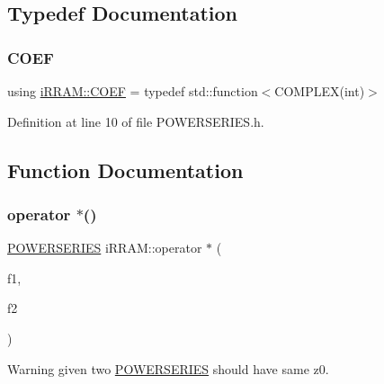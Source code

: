 \subsection{Typedef Documentation}
\mbox{\label{namespacei_r_r_a_m_a7fb438d61c85aface41ae108812df36f}} 
\subsubsection{\texorpdfstring{COEF}{COEF}}
{\footnotesize\ttfamily using \mbox{\hyperlink{namespacei_r_r_a_m_a7fb438d61c85aface41ae108812df36f}{i\+R\+R\+A\+M\+::\+C\+O\+EF}} = typedef std\+::function$<$C\+O\+M\+P\+L\+EX(int)$>$}



Definition at line 10 of file P\+O\+W\+E\+R\+S\+E\+R\+I\+E\+S.\+h.



\subsection{Function Documentation}
\mbox{\label{namespacei_r_r_a_m_a26a16dd1e1f58b33a07c80c72fb3664a}} 
\subsubsection{\texorpdfstring{operator $\ast$()}{operator *()}}
{\footnotesize\ttfamily \mbox{\hyperlink{classi_r_r_a_m_1_1_p_o_w_e_r_s_e_r_i_e_s}{P\+O\+W\+E\+R\+S\+E\+R\+I\+ES}} i\+R\+R\+A\+M\+::operator $\ast$ (\begin{DoxyParamCaption}\item[{const \mbox{\hyperlink{classi_r_r_a_m_1_1_p_o_w_e_r_s_e_r_i_e_s}{P\+O\+W\+E\+R\+S\+E\+R\+I\+ES}} \&}]{f1,  }\item[{const \mbox{\hyperlink{classi_r_r_a_m_1_1_p_o_w_e_r_s_e_r_i_e_s}{P\+O\+W\+E\+R\+S\+E\+R\+I\+ES}} \&}]{f2 }\end{DoxyParamCaption})}

\begin{DoxyWarning}{Warning}
given two \mbox{\hyperlink{classi_r_r_a_m_1_1_p_o_w_e_r_s_e_r_i_e_s}{P\+O\+W\+E\+R\+S\+E\+R\+I\+ES}} should have same z0. 
\end{DoxyWarning}


